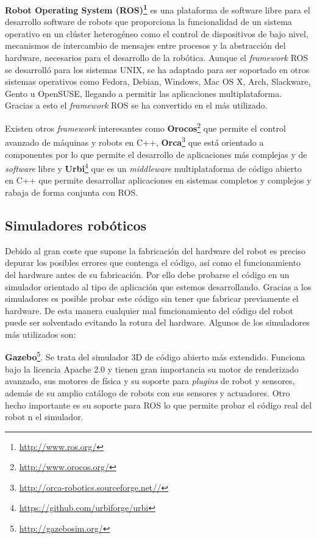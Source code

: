 \textbf{Robot Operating System (ROS)\footnote{\url{http://www.ros.org/}}} es una plataforma de software libre para el desarrollo software de robots que proporciona la funcionalidad de un sistema operativo en un clúster heterogéneo como el control de dispositivos de bajo nivel, mecanismos de intercambio de mensajes entre procesos y la abstracción del hardware, necesarios para el desarrollo de la robótica. Aunque el \textit{framework} ROS se desarrolló para los sistemas UNIX, se ha adaptado para ser soportado en otros sistemas operativos como Fedora, Debian, Windows, Mac OS X, Arch, Slackware, Gento u OpenSUSE, llegando a permitir las aplicaciones multiplataforma. Gracias a esto el \textit{framework} ROS se ha convertido en el más utilizado.

Existen otros \textit{framework} interesantes como \textbf{Orocos}\footnote{\url{http://www.orocos.org/}} que permite el control avanzado de máquinas y robots en C++, \textbf{Orca}\footnote{\url{http://orca-robotics.sourceforge.net//}} que está orientado a componentes por lo que permite el desarrollo de aplicaciones más complejas y de \textit{software} libre y \textbf{Urbi}\footnote{\url{https://github.com/urbiforge/urbi}} que es un \textit{middleware} multiplataforma de código abierto en C++ que permite desarrollar aplicaciones en sistemas completos y complejos y rabaja de forma conjunta con ROS.

\subsection{Simuladores robóticos}
Debido al gran coste que supone la fabricación del hardware del robot es preciso depurar los posibles errores que contenga el código, así como el funcionamiento del hardware antes de su fabricación. Por ello debe probarse el código en un simulador orientado al tipo de aplicación que estemos desarrollando. Gracias a los simuladores es posible probar este código sin tener que fabricar previamente el hardware. De esta manera cualquier mal funcionamiento del código del robot puede ser solventado evitando la rotura del hardware. Algunos de los simuladores más utilizados son:

\textbf{Gazebo}\footnote{\url{http://gazebosim.org/}}. Se trata del simulador 3D de código abierto más extendido. Funciona bajo la licencia Apache 2.0 y tienen gran importancia su motor de renderizado avanzado, sus motores de física y su soporte para \textit{plugins} de robot y sensores, además de su amplio catálogo de robots con sus sensores y actuadores. Otro hecho importante es su soporte para ROS lo que permite probar el código real del robot n el simulador.

